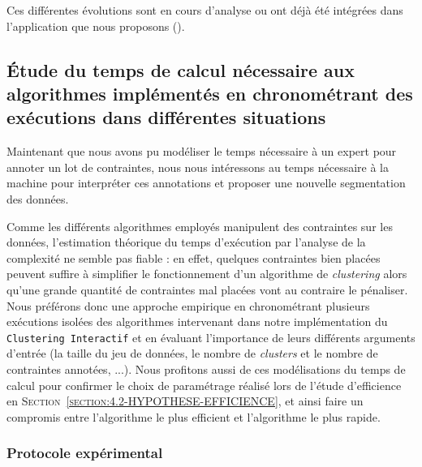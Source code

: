 			\begin{leftBarInformation}
				Ces différentes évolutions sont en cours d'analyse ou ont déjà été intégrées dans l'application que nous proposons (\cite{schild-etal:2022:cognitivefactory-interactiveclusteringgui}).
			\end{leftBarInformation}
	

	\subsection{Étude du temps de calcul nécessaire aux algorithmes implémentés en chronométrant des exécutions dans différentes situations}
	\label{section:4.3.2-ETUDE-COUTS-TEMPS-CALCUL}
		
		Maintenant que nous avons pu modéliser le temps nécessaire à un expert pour annoter un lot de contraintes, nous nous intéressons au temps nécessaire à la machine pour interpréter ces annotations et proposer une nouvelle segmentation des données.
		
		Comme les différents algorithmes employés manipulent des contraintes sur les données, l'estimation théorique du temps d'exécution par l'analyse de la complexité ne semble pas fiable : en effet, quelques contraintes bien placées peuvent suffire à simplifier le fonctionnement d'un algorithme de \textit{clustering} alors qu'une grande quantité de contraintes mal placées vont au contraire le pénaliser.
		Nous préférons donc une approche empirique en chronométrant plusieurs exécutions isolées des algorithmes intervenant dans notre implémentation du \texttt{Clustering Interactif} et en évaluant l'importance de leurs différents arguments d'entrée (la taille du jeu de données, le nombre de \textit{clusters} et le nombre de contraintes annotées, ...).
		Nous profitons aussi de ces modélisations du temps de calcul pour confirmer le choix de paramétrage réalisé lors de l'étude d'efficience en \textsc{Section~\ref{section:4.2-HYPOTHESE-EFFICIENCE}}, et ainsi faire un compromis entre l'algorithme le plus efficient et l'algorithme le plus rapide.
	
		\subsubsection{Protocole expérimental}
			
